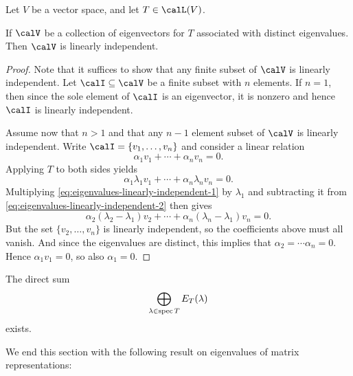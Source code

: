 Let $V$ be a vector space, and let $T \in \lin(V)$.

\begin{proposition}
    If $\calV$ be a collection of eigenvectors for $T$ associated with distinct eigenvalues. Then $\calV$ is linearly independent.
\end{proposition}

\begin{proof}
    Note that it suffices to show that any finite subset of $\calV$ is linearly independent. Let $\calI \subseteq \calV$ be a finite subset with $n$ elements. If $n = 1$, then since the sole element of $\calI$ is an eigenvector, it is nonzero and hence $\calI$ is linearly independent.

    Assume now that $n > 1$ and that any $n-1$ element subset of $\calV$ is linearly independent. Write $\calI = \{v_1, \ldots, v_n\}$ and consider a linear relation
    \begin{equation}
        \label{eq:eigenvalues-linearly-independent-1}
        \alpha_1 v_1 + \cdots + \alpha_n v_n = 0.
    \end{equation}
    Applying $T$ to both sides yields
    \begin{equation}
        \label{eq:eigenvalues-linearly-independent-2}
        \alpha_1 \lambda_1 v_1 + \cdots + \alpha_n \lambda_n v_n = 0.
    \end{equation}
    Multiplying \cref{eq:eigenvalues-linearly-independent-1} by $\lambda_1$ and subtracting it from \cref{eq:eigenvalues-linearly-independent-2} then gives
    \begin{equation*}
        \alpha_2 (\lambda_2 - \lambda_1) v_2 + \cdots + \alpha_n (\lambda_n - \lambda_1) v_n = 0.
    \end{equation*}
    But the set $\{v_2, \ldots, v_n\}$ is linearly independent, so the coefficients above must all vanish. And since the eigenvalues are distinct, this implies that $\alpha_2 = \cdots \alpha_n = 0$. Hence $\alpha_1 v_1 = 0$, so also $\alpha_1 = 0$.
\end{proof}


\begin{corollarynoproof}
    The direct sum
    \begin{equation*}
        \bigoplus_{\lambda \in \operatorname{spec} T} E_T(\lambda)
    \end{equation*}
    exists.
\end{corollarynoproof}


We end this section with the following result on eigenvalues of matrix representations:

